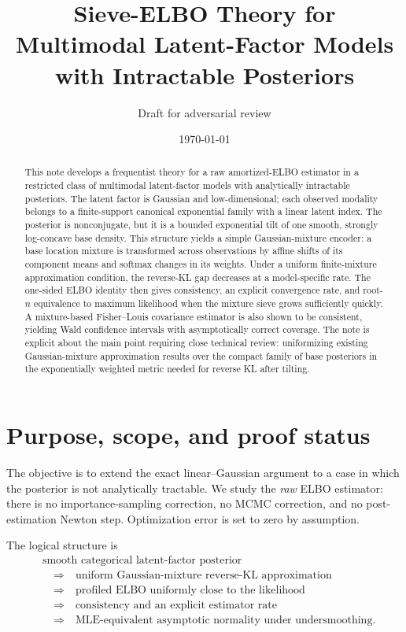 \documentclass[11pt]{article}
\title{Sieve-ELBO Theory for Multimodal Latent-Factor Models\\with Intractable Posteriors}
\author{Draft for adversarial review}
\date{\today}
\theoremstyle{definition}
\begin{document}
\maketitle

\begin{abstract}
This note develops a frequentist theory for a raw amortized-ELBO estimator in a restricted class of multimodal latent-factor models with analytically intractable posteriors. The latent factor is Gaussian and low-dimensional; each observed modality belongs to a finite-support canonical exponential family with a linear latent index. The posterior is nonconjugate, but it is a bounded exponential tilt of one smooth, strongly log-concave base density. This structure yields a simple Gaussian-mixture encoder: a base location mixture is transformed across observations by affine shifts of its component means and softmax changes in its weights. Under a uniform finite-mixture approximation condition, the reverse-KL gap decreases at a model-specific rate. The one-sided ELBO identity then gives consistency, an explicit convergence rate, and root-$n$ equivalence to maximum likelihood when the mixture sieve grows sufficiently quickly. A mixture-based Fisher--Louis covariance estimator is also shown to be consistent, yielding Wald confidence intervals with asymptotically correct coverage. The note is explicit about the main point requiring close technical review: uniformizing existing Gaussian-mixture approximation results over the compact family of base posteriors in the exponentially weighted metric needed for reverse KL after tilting.
\end{abstract}

\section{Purpose, scope, and proof status}

The objective is to extend the exact linear--Gaussian argument to a case in which the posterior is not analytically tractable. We study the \emph{raw} ELBO estimator: there is no importance-sampling correction, no MCMC correction, and no post-estimation Newton step. Optimization error is set to zero by assumption.

The logical structure is
\[
\begin{aligned}
&\text{smooth categorical latent-factor posterior}
\\[-0.15em]
&\quad\Longrightarrow\quad
\text{uniform Gaussian-mixture reverse-KL approximation}
\\[-0.15em]
&\quad\Longrightarrow\quad
\text{profiled ELBO uniformly close to the likelihood}
\\[-0.15em]
&\quad\Longrightarrow\quad
\text{consistency and an explicit estimator rate}
\\[-0.15em]
&\quad\Longrightarrow\quad
\text{MLE-equivalent asymptotic normality under undersmoothing.}
\end{aligned}
\]
\end{document}
